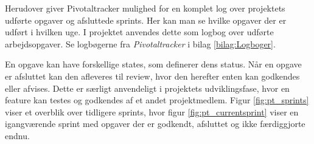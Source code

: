 Herudover giver Pivotaltracker mulighed for en komplet log over projektets udførte opgaver og afsluttede sprints. Her kan man se hvilke opgaver der er udført i hvilken uge. I projektet anvendes dette som logbog over udførte arbejdsopgaver. Se logbøgerne fra \textit{Pivotaltracker} i bilag \ref{bilag:Logboger}.

En opgave kan have forskellige states, som definerer dens status. Når en opgave er afsluttet kan den afleveres til review, hvor den herefter enten kan godkendes eller afvises. Dette er særligt anvendeligt i projektets udviklingsfase, hvor en feature kan testes og godkendes af et andet projektmedlem. Figur \ref{fig:pt_sprints}  viser et overblik over tidligere sprints, hvor figur \ref{fig:pt_currentsprint} viser en igangværende sprint med opgaver der er godkendt, afsluttet og ikke færdiggjorte endnu.

